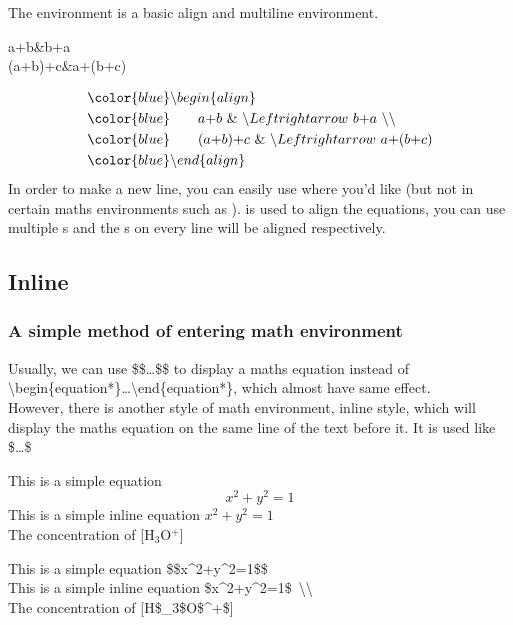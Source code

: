 \documentclass{beamer}
\newcommand{\samplecommand}[1]{\alert{\textbackslash #1}}
\begin{document}
\begin{frame}
	The  environment is a basic align and multiline environment.\\
	\begin{example}
		\begin{flalign}
			a+b&\Leftrightarrow b+a\\
			(a+b)+c&\Leftrightarrow a+(b+c)
		\end{flalign}
	\end{example}
	\begin{align*}
		&\color{blue} \backslash begin\{align\}\\
		&\color{blue} \quad\quad a\text{+}b\ \&\ \backslash Leftrightarrow\ b\text{+}a\ \backslash\backslash \\
		&\color{blue} \quad\quad (a\text{+}b)\text{+}c\ \&\ \backslash Leftrightarrow\ a\text{+}(b\text{+}c)\\
		&\color{blue} \backslash end\{align\}
	\end{align*}
	In order to make a new line, you can easily use \structure{\textbackslash\textbackslash} where you'd like (but not in certain maths environments such as ). \structure{\&} is used to align the equations, you can use multiple \structure{\&}s and the \structure{\&}s on every line will be aligned respectively.
\end{frame}

\subsection{Inline}

\begin{frame}
	\frametitle{A simple method of entering math environment}
	Usually, we can use \alert{\$\$}\dots\alert{\$\$} to display a maths equation instead of \samplecommand{begin}\{equation*\}\dots\samplecommand{end}\{equation*\}, which almost have same effect.\\[0.5em]
	However, there is another style of math environment, inline style, which will display the maths equation on the same line of the text before it. It is used like \alert{\$}\dots\alert{\$}
	\begin{example}
		This is a simple equation $$x^2+y^2=1$$
		This is a simple inline equation $x^2+y^2=1$	 \\
		The concentration of [H$_3$O$^+$]
	\end{example}
	{\color{blue}This is a simple equation \$\$x\^{}2+y\^{}2=1\$\$}\\
	{\color{blue}This is a simple inline equation \$x\^{}2+y\^{}2=1\$\ \textbackslash\textbackslash}\\
	{\color{blue}The concentration of [H\$\_3\$O\$\^{}+\$]}
\end{frame}
\end{document}
